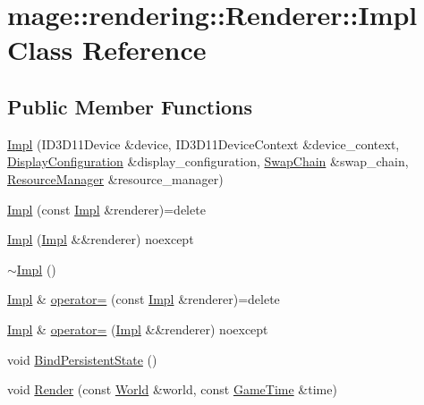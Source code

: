 \hypertarget{classmage_1_1rendering_1_1_renderer_1_1_impl}{}\section{mage\+:\+:rendering\+:\+:Renderer\+:\+:Impl Class Reference}
\label{classmage_1_1rendering_1_1_renderer_1_1_impl}
\subsection*{Public Member Functions}
\begin{DoxyCompactItemize}
\item 
\mbox{\hyperlink{classmage_1_1rendering_1_1_renderer_1_1_impl_a51ee7e924709bda3d53e73e21352849c}{Impl}} (I\+D3\+D11\+Device \&device, I\+D3\+D11\+Device\+Context \&device\+\_\+context, \mbox{\hyperlink{classmage_1_1rendering_1_1_display_configuration}{Display\+Configuration}} \&display\+\_\+configuration, \mbox{\hyperlink{classmage_1_1rendering_1_1_swap_chain}{Swap\+Chain}} \&swap\+\_\+chain, \mbox{\hyperlink{classmage_1_1rendering_1_1_resource_manager}{Resource\+Manager}} \&resource\+\_\+manager)
\item 
\mbox{\hyperlink{classmage_1_1rendering_1_1_renderer_1_1_impl_a533defdba4bd48054c166ecbb46178f5}{Impl}} (const \mbox{\hyperlink{classmage_1_1rendering_1_1_renderer_1_1_impl}{Impl}} \&renderer)=delete
\item 
\mbox{\hyperlink{classmage_1_1rendering_1_1_renderer_1_1_impl_abc02d1958ce940e8b13d4fe3de3fd05f}{Impl}} (\mbox{\hyperlink{classmage_1_1rendering_1_1_renderer_1_1_impl}{Impl}} \&\&renderer) noexcept
\item 
\mbox{\hyperlink{classmage_1_1rendering_1_1_renderer_1_1_impl_a80064673490a87b9f3cd567e56d3de8f}{$\sim$\+Impl}} ()
\item 
\mbox{\hyperlink{classmage_1_1rendering_1_1_renderer_1_1_impl}{Impl}} \& \mbox{\hyperlink{classmage_1_1rendering_1_1_renderer_1_1_impl_a8eef87ba80c22cba7a2d83db9a740188}{operator=}} (const \mbox{\hyperlink{classmage_1_1rendering_1_1_renderer_1_1_impl}{Impl}} \&renderer)=delete
\item 
\mbox{\hyperlink{classmage_1_1rendering_1_1_renderer_1_1_impl}{Impl}} \& \mbox{\hyperlink{classmage_1_1rendering_1_1_renderer_1_1_impl_a1c40e03347062b200b3e1b214ea7b3ff}{operator=}} (\mbox{\hyperlink{classmage_1_1rendering_1_1_renderer_1_1_impl}{Impl}} \&\&renderer) noexcept
\item 
void \mbox{\hyperlink{classmage_1_1rendering_1_1_renderer_1_1_impl_a86f42e039c290e75378040805533bd41}{Bind\+Persistent\+State}} ()
\item 
void \mbox{\hyperlink{classmage_1_1rendering_1_1_renderer_1_1_impl_a88a8601b5fe72883788a87ba6c38b3aa}{Render}} (const \mbox{\hyperlink{classmage_1_1rendering_1_1_world}{World}} \&world, const \mbox{\hyperlink{classmage_1_1_game_time}{Game\+Time}} \&time)
\end{DoxyCompactItemize}
